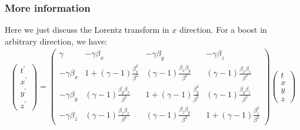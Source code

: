 \documentclass[]{ctexart}
\begin{document}
		\subsubsection{More information}
			Here we just discuss the Lorentz transform in $x$ direction. For a boost in arbitrary direction, we have:
				\begin{equation*}
				\begin{aligned}
					\begin{pmatrix}
						t^{\prime} \\
						x^{\prime} \\
						y^{\prime} \\
						z^{\prime}
					\end{pmatrix}
					=
					\begin{pmatrix}
						\gamma & -\gamma \beta_{x} & -\gamma \beta_{y} & -\gamma \beta_{z} \\
						-\gamma \beta_{x} & 1+(\gamma-1) \frac{\beta_{x}^{2}}{\beta^{2}} & (\gamma-1) \frac{\beta_{x} \beta_{y}}{\beta^{2}} & (\gamma-1) \frac{\beta_{x} \beta_{z}}{\beta^{2}} \\
						-\gamma \beta_{y} & (\gamma-1) \frac{\beta_{y} \beta_{x}}{\beta^{2}} & 1+(\gamma-1) \frac{\beta_{y}^{2}}{\beta^{2}} & (\gamma-1) \frac{\beta_{y} \beta_{z}}{\beta^{2}} \\
						-\gamma \beta_{z} & (\gamma-1) \frac{\beta_{z} \beta_{x}}{\beta^{2}} & (\gamma-1) \frac{\beta_{z} \beta_{y}}{\beta^{2}} & 1+(\gamma-1) \frac{\beta_{z}^{2}}{\beta^{2}}
					\end{pmatrix}
					\begin{pmatrix}
						t \\
						x \\
						y \\
						z
					\end{pmatrix}
				\end{aligned}
				\end{equation*}
			
\end{document}
